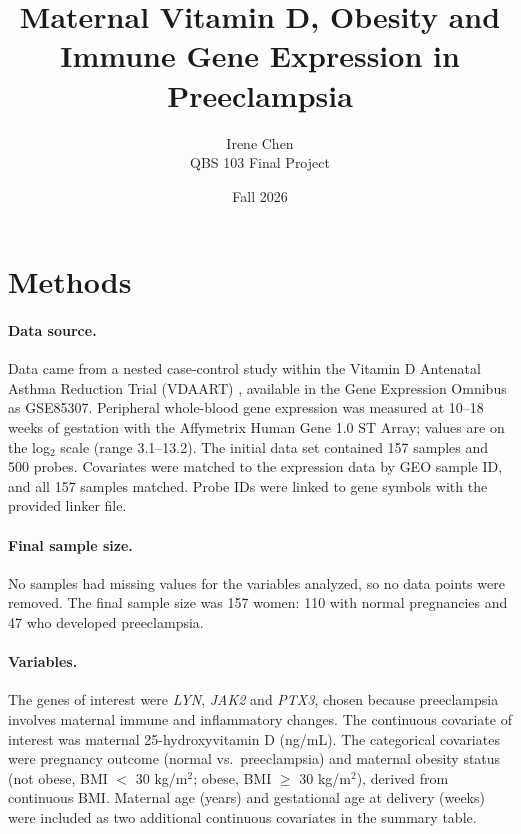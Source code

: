 \documentclass[11pt]{article}
\title{Maternal Vitamin D, Obesity and Immune Gene Expression in Preeclampsia}
\author{Irene Chen \\ QBS 103 Final Project}
\date{Fall 2026}
\begin{document}
\maketitle

\section{Methods}

\paragraph{Data source.}
Data came from a nested case-control study within the Vitamin D Antenatal Asthma Reduction
Trial (VDAART) \cite{mirzakhani2016}, available in the Gene Expression Omnibus as GSE85307.
Peripheral whole-blood gene expression was measured at 10--18 weeks of gestation with the
Affymetrix Human Gene 1.0 ST Array; values are on the log$_2$ scale (range 3.1--13.2). The
initial data set contained 157 samples and 500 probes. Covariates were
matched to the expression data by GEO sample ID, and all 157 samples matched. Probe IDs were
linked to gene symbols with the provided linker file.

\paragraph{Final sample size.}
No samples had missing values for the variables analyzed, so no data points were removed. The
final sample size was 157 women: 110 with normal pregnancies and 47 who developed preeclampsia.

\paragraph{Variables.}
The genes of interest were \textit{LYN}, \textit{JAK2} and \textit{PTX3}, chosen because
preeclampsia involves maternal immune and inflammatory changes. The continuous covariate of
interest was maternal 25-hydroxyvitamin D (ng/mL). The categorical covariates were pregnancy
outcome (normal vs.\ preeclampsia) and maternal obesity status (not obese, BMI $<$ 30 kg/m$^2$;
obese, BMI $\geq$ 30 kg/m$^2$), derived from continuous BMI. Maternal age (years) and
gestational age at delivery (weeks) were included as two additional continuous covariates in
the summary table.
\end{document}
